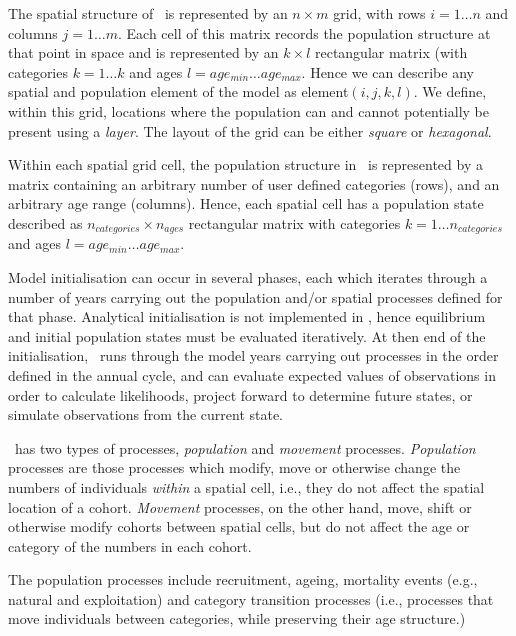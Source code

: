 The spatial structure of \SPM\ is represented by an $n \times m$ grid, with rows $i=1 \dots n$ and columns $j=1 \ldots m$. Each cell of this matrix records the population structure at that point in space and is represented by an $k \times l$ rectangular matrix (with categories $k=1 \ldots k$ and ages $l=age_{min} \ldots age_{max}$. Hence we can describe any spatial and population element of the model as element$(i,j,k,l)$. We define, within this grid, locations where the population can and cannot potentially be present using a \emph{layer}. The layout of the grid can be either \emph{square} or \emph{hexagonal}.

Within each spatial grid cell, the population structure in \SPM\ is represented by a matrix containing an arbitrary number of user defined categories (rows), and an arbitrary age range (columns). Hence, each spatial cell has a population state described as $n_{categories} \times n_{ages}$ rectangular matrix with categories $k=1 \ldots n_{categories}$ and ages $l=age_{min} \ldots age_{max}$. 

Model initialisation can occur in several phases, each which iterates through a number of years carrying out the population and/or spatial processes defined for that phase. Analytical initialisation is not implemented in \SPM, hence equilibrium and initial population states must be evaluated iteratively. At then end of the initialisation, \SPM\ runs through the model years carrying out processes in the order defined in the annual cycle, and can evaluate expected values of observations in order to calculate likelihoods, project forward to determine future states, or simulate observations from the current state.

\SPM\ has two types of processes, \emph{population} and \emph{movement} processes. \emph{Population} processes are those processes which modify, move or otherwise change the numbers of individuals \emph{within} a spatial cell, i.e., they do not affect the spatial location of a cohort. \emph{Movement} processes, on the other hand, move, shift or otherwise modify cohorts between spatial cells, but do not affect the age or category of the numbers in each cohort. 

The population processes include recruitment, ageing,  mortality events (e.g., natural and exploitation) and category transition processes (i.e., processes that move individuals between categories, while preserving their age structure.) 

